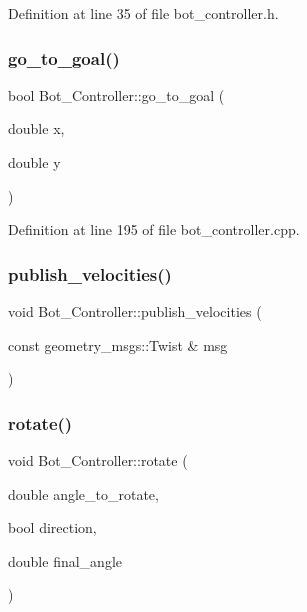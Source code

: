 Definition at line 35 of file bot\+\_\+controller.\+h.

\mbox{\label{class_bot___controller_a7bd188779f02159f9fdfea435caf94b1}} 
\subsubsection{\texorpdfstring{go\+\_\+to\+\_\+goal()}{go\_to\_goal()}}
{\footnotesize\ttfamily bool Bot\+\_\+\+Controller\+::go\+\_\+to\+\_\+goal (\begin{DoxyParamCaption}\item[{double}]{x,  }\item[{double}]{y }\end{DoxyParamCaption})}



Definition at line 195 of file bot\+\_\+controller.\+cpp.

\mbox{\label{class_bot___controller_a7c4af8b19d122f72582b5bbd309ded7a}} 
\subsubsection{\texorpdfstring{publish\+\_\+velocities()}{publish\_velocities()}}
{\footnotesize\ttfamily void Bot\+\_\+\+Controller\+::publish\+\_\+velocities (\begin{DoxyParamCaption}\item[{const geometry\+\_\+msgs\+::\+Twist \&}]{msg }\end{DoxyParamCaption})}

\mbox{\label{class_bot___controller_a8ea05eaf643a647581a0f60ab9c85c24}} 
\subsubsection{\texorpdfstring{rotate()}{rotate()}}
{\footnotesize\ttfamily void Bot\+\_\+\+Controller\+::rotate (\begin{DoxyParamCaption}\item[{double}]{angle\+\_\+to\+\_\+rotate,  }\item[{bool}]{direction,  }\item[{double}]{final\+\_\+angle }\end{DoxyParamCaption})}



